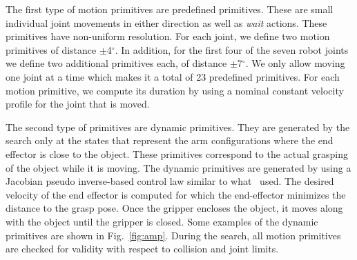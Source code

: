 \documentclass[a4paper]{report}
\begin{document}
The first type of motion primitives are predefined primitives. These are small individual joint movements in either direction as well as \emph{wait} actions.
These primitives have non-uniform resolution. For each joint, we define two  motion primitives of distance $\pm$4$^{\circ}$. In addition, for the first four of the seven robot joints we define  two additional  primitives each, of distance $\pm$7$^{\circ}$. We only allow moving one joint at a time which makes it a total of 23 predefined primitives.
For each motion primitive, we compute its duration by using a nominal constant velocity profile for the  joint that is moved.
%

The second type of primitives are dynamic primitives. They are generated by the search only at the states that represent the arm configurations where the end effector is close to the object. These primitives correspond to the actual grasping of the object while it is moving.
The dynamic primitives are generated by using a Jacobian pseudo inverse-based control law similar to what~\cite{menon2014motion} used. 
The desired velocity of the end effector is computed for which the end-effector minimizes the distance to the grasp pose. Once the gripper encloses the object, it moves along with the object until the gripper is closed. Some examples of the dynamic primitives are shown in Fig.~\ref{fig:amp}. During the search, all motion primitives are checked for validity with respect to collision and joint limits.
\end{document}
